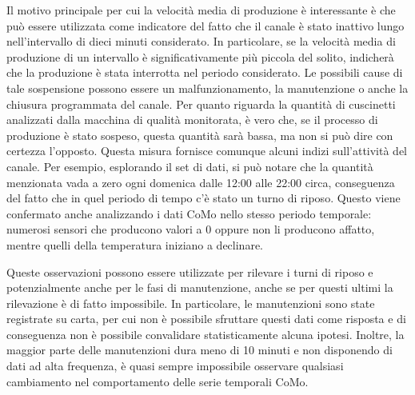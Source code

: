 Il motivo principale per cui la velocità media di produzione è interessante è che può essere utilizzata come indicatore del fatto che il canale è stato inattivo lungo nell'intervallo di dieci minuti considerato. In particolare, se la velocità media di produzione di un intervallo è significativamente più piccola del solito, indicherà che la produzione è stata interrotta nel periodo considerato. Le possibili cause di tale sospensione possono essere un malfunzionamento, la manutenzione o anche la chiusura programmata del canale.
Per quanto riguarda la quantità di cuscinetti analizzati dalla macchina di qualità monitorata, è vero che, se il processo di produzione è stato sospeso, questa quantità sarà bassa, ma non si può dire con certezza l'opposto.
Questa misura fornisce comunque alcuni indizi sull'attività del canale. Per esempio, esplorando il set di dati, si può notare che la quantità menzionata vada a zero ogni domenica dalle 12:00 alle 22:00 circa, conseguenza del fatto che in quel periodo di tempo c'è stato un turno di riposo. Questo viene confermato anche analizzando i dati CoMo nello stesso periodo temporale: numerosi sensori che producono valori a 0 oppure non li producono affatto, mentre quelli della temperatura iniziano a declinare. 

Queste osservazioni possono essere utilizzate per rilevare i turni di riposo e potenzialmente anche per le fasi di manutenzione, anche se per questi ultimi la rilevazione è di fatto impossibile. In particolare, le manutenzioni sono state registrate su carta, per cui non è possibile sfruttare questi dati come risposta e di conseguenza non è possibile convalidare statisticamente alcuna ipotesi.
Inoltre, la maggior parte delle manutenzioni dura meno di 10 minuti e
non disponendo di dati ad alta frequenza, è quasi sempre impossibile
osservare qualsiasi cambiamento nel comportamento delle serie temporali CoMo. 

